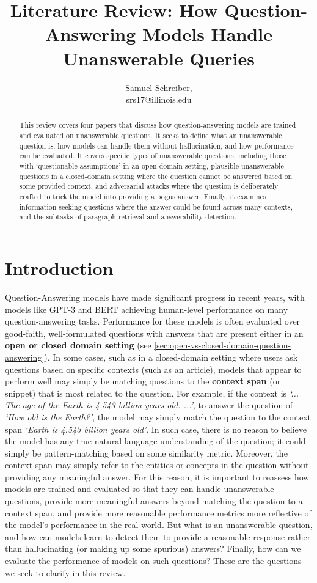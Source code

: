 \documentclass[letterpaper, 11pt]{article}
\title{Literature Review: How Question-Answering Models Handle Unanswerable Queries}
\author{Samuel Schreiber,\\ srs17@illinois.edu}
\begin{document}
\maketitle

\begin{abstract}
This review covers four papers that discuss how question-answering models are trained and evaluated on unanswerable questions. It seeks to define what an unanswerable question is, how models can handle them without hallucination,
and how performance can be evaluated. It covers specific types of unanswerable questions, including those with `questionable assumptions' in an open-domain setting, plausible unanswerable questions in a closed-domain setting
where the question cannot be answered based on some provided context, and adversarial attacks where the question is deliberately crafted to trick the model into providing a bogus answer.
Finally, it examines information-seeking questions where the answer could be found across many contexts, and the subtasks of paragraph retrieval and answerability detection. 
\end{abstract}

\section{Introduction}
\label{sec:introduction}

Question-Answering models have made significant progress in recent years, with models like GPT-3 and BERT achieving human-level performance on many question-answering tasks. Performance for these models is often evaluated over good-faith, well-formulated questions with answers that are present either in an \textbf{open or closed domain setting}  (see \ref{sec:open-vs-closed-domain-question-answering}). In some cases, such as in a closed-domain setting where users ask questions based on specific contexts (such as an article), 
models that appear to perform well may simply be matching questions to the \textbf{context span} (or snippet) that is most related to the question. For example, if the context is \textit{`... The age of the Earth is 4.543 billion years old. ...'}, to answer the question of \textit{`How old is the Earth?'}, the model may simply match the question to the context span \textit{`Earth is 4.543 billion years old'}.
In such case, there is no reason to believe the model has any true natural language understanding of the question; it could simply be pattern-matching based on some similarity metric. Moreover, the context span may simply refer to the entities or concepts in the question without providing any meaningful answer. For this reason, it is important to reassess how models are trained and evaluated so that they can handle unanswerable questions, provide more meaningful answers beyond matching the question to a context span, and provide more reasonable performance metrics
more reflective of the model's performance in the real world. But what is an unanswerable question, and how can models learn to detect them to provide a reasonable response rather than hallucinating (or making up some spurious) answers? Finally, how can we evaluate the performance of models on such questions?
These are the questions we seek to clarify in this review.
\end{document}
